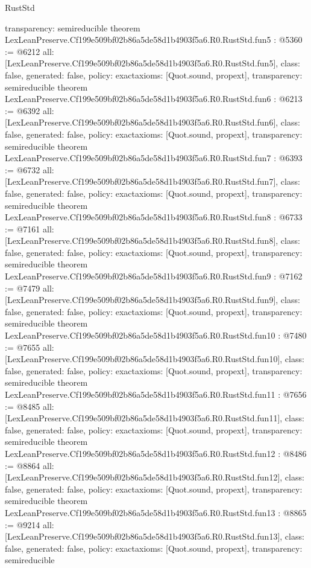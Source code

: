 \begin{lexlean}{RustStd}
\begin{coremodule}
{  transparency: semireducible
}
theorem LexLeanPreserve.Cf199e509bf02b86a5de58d1b4903f5a6.R0.RustStd.fun5 : @5360 := @6212 {
  all: [LexLeanPreserve.Cf199e509bf02b86a5de58d1b4903f5a6.R0.RustStd.fun5],
  class: false,
  generated: false,
  policy: exact{axioms: [Quot.sound, propext]},
  transparency: semireducible
}
theorem LexLeanPreserve.Cf199e509bf02b86a5de58d1b4903f5a6.R0.RustStd.fun6 : @6213 := @6392 {
  all: [LexLeanPreserve.Cf199e509bf02b86a5de58d1b4903f5a6.R0.RustStd.fun6],
  class: false,
  generated: false,
  policy: exact{axioms: [Quot.sound, propext]},
  transparency: semireducible
}
theorem LexLeanPreserve.Cf199e509bf02b86a5de58d1b4903f5a6.R0.RustStd.fun7 : @6393 := @6732 {
  all: [LexLeanPreserve.Cf199e509bf02b86a5de58d1b4903f5a6.R0.RustStd.fun7],
  class: false,
  generated: false,
  policy: exact{axioms: [Quot.sound, propext]},
  transparency: semireducible
}
theorem LexLeanPreserve.Cf199e509bf02b86a5de58d1b4903f5a6.R0.RustStd.fun8 : @6733 := @7161 {
  all: [LexLeanPreserve.Cf199e509bf02b86a5de58d1b4903f5a6.R0.RustStd.fun8],
  class: false,
  generated: false,
  policy: exact{axioms: [Quot.sound, propext]},
  transparency: semireducible
}
theorem LexLeanPreserve.Cf199e509bf02b86a5de58d1b4903f5a6.R0.RustStd.fun9 : @7162 := @7479 {
  all: [LexLeanPreserve.Cf199e509bf02b86a5de58d1b4903f5a6.R0.RustStd.fun9],
  class: false,
  generated: false,
  policy: exact{axioms: [Quot.sound, propext]},
  transparency: semireducible
}
theorem LexLeanPreserve.Cf199e509bf02b86a5de58d1b4903f5a6.R0.RustStd.fun10 : @7480 := @7655 {
  all: [LexLeanPreserve.Cf199e509bf02b86a5de58d1b4903f5a6.R0.RustStd.fun10],
  class: false,
  generated: false,
  policy: exact{axioms: [Quot.sound, propext]},
  transparency: semireducible
}
theorem LexLeanPreserve.Cf199e509bf02b86a5de58d1b4903f5a6.R0.RustStd.fun11 : @7656 := @8485 {
  all: [LexLeanPreserve.Cf199e509bf02b86a5de58d1b4903f5a6.R0.RustStd.fun11],
  class: false,
  generated: false,
  policy: exact{axioms: [Quot.sound, propext]},
  transparency: semireducible
}
theorem LexLeanPreserve.Cf199e509bf02b86a5de58d1b4903f5a6.R0.RustStd.fun12 : @8486 := @8864 {
  all: [LexLeanPreserve.Cf199e509bf02b86a5de58d1b4903f5a6.R0.RustStd.fun12],
  class: false,
  generated: false,
  policy: exact{axioms: [Quot.sound, propext]},
  transparency: semireducible
}
theorem LexLeanPreserve.Cf199e509bf02b86a5de58d1b4903f5a6.R0.RustStd.fun13 : @8865 := @9214 {
  all: [LexLeanPreserve.Cf199e509bf02b86a5de58d1b4903f5a6.R0.RustStd.fun13],
  class: false,
  generated: false,
  policy: exact{axioms: [Quot.sound, propext]},
  transparency: semireducible
}
\end{coremodule}
\end{lexlean}
